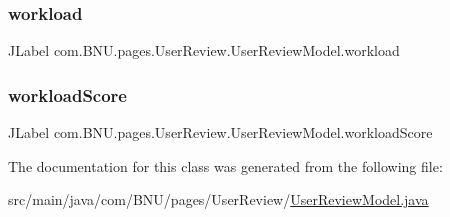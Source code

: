 \subsubsection{\texorpdfstring{workload}{workload}}
{\footnotesize\ttfamily J\+Label com.\+B\+N\+U.\+pages.\+User\+Review.\+User\+Review\+Model.\+workload\hspace{0.3cm}{\ttfamily [private]}}

\mbox{\label{classcom_1_1_b_n_u_1_1pages_1_1_user_review_1_1_user_review_model_ab3c079414ba5b6f4f833951fbd028f17}} 
\subsubsection{\texorpdfstring{workload\+Score}{workloadScore}}
{\footnotesize\ttfamily J\+Label com.\+B\+N\+U.\+pages.\+User\+Review.\+User\+Review\+Model.\+workload\+Score\hspace{0.3cm}{\ttfamily [private]}}



The documentation for this class was generated from the following file\+:\begin{DoxyCompactItemize}
\item 
src/main/java/com/\+B\+N\+U/pages/\+User\+Review/\mbox{\hyperlink{_user_review_model_8java}{User\+Review\+Model.\+java}}\end{DoxyCompactItemize}
